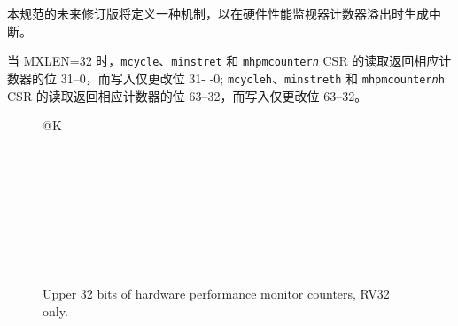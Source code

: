 \begin{commentary}
本规范的未来修订版将定义一种机制，以在硬件性能监视器计数器溢出时生成中断。
\end{commentary}

\iffalse
When MXLEN=32, reads of the {\tt mcycle}, {\tt minstret}, and {\tt
mhpmcounter{\em n}} CSRs return bits 31--0 of the corresponding counter, and
writes change only bits 31--0; reads of the {\tt mcycleh}, {\tt minstreth},
and {\tt mhpmcounter{\em n}h} CSRs return bits 63--32 of the corresponding
counter, and writes change only bits 63--32.
\fi

当 MXLEN=32 时，{\tt mcycle}、{\tt minstret} 和 {\tt mhpmcounter{\em n}} CSR 的读取返回相应计数器的位 31--0，而写入仅更改位 31- -0; {\tt mcycleh}、{\tt minstreth} 和 {\tt mhpmcounter{\em n}h} CSR 的读取返回相应计数器的位 63--32，而写入仅更改位 63--32。

\begin{figure}[h!]
{\footnotesize
\begin{center}
\begin{tabular}{@{}K}
 \\ \hline
{} \\ \hline
{} \\ \hline
{} \\ \hline
{} \\ \hline
{}  \\ \hline
{} \\ \hline
{} \\  \\
\end{tabular}
\end{center}
}
\vspace{-0.1in}
\caption{Upper 32 bits of hardware performance monitor counters, RV32 only.}
\end{figure}



